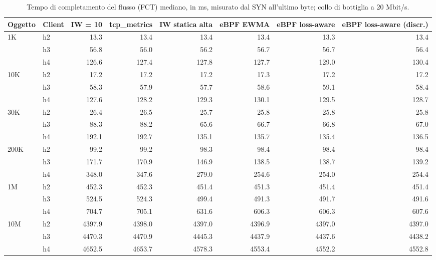 \begin{table}[htbp]
  \centering
  \caption{Tempo di completamento del flusso (FCT) mediano, in ms, misurato dal SYN all'ultimo byte; collo di bottiglia a 20 Mbit/s.}
  \label{tab:fct-med-20}
  \begin{tabular}{llrrrrrr}
    \toprule
    Oggetto & Client & IW = 10 & tcp\_metrics & IW statica alta & eBPF EWMA & eBPF loss-aware & eBPF loss-aware (discr.) \\
    \midrule
    1K & h2 & 13.3 & 13.4 & 13.4 & 13.4 & 13.3 & 13.4 \\
     & h3 & 56.8 & 56.0 & 56.2 & 56.7 & 56.7 & 56.4 \\
     & h4 & 126.6 & 127.4 & 127.8 & 127.7 & 129.0 & 130.4 \\
    \addlinespace
    10K & h2 & 17.2 & 17.2 & 17.2 & 17.3 & 17.2 & 17.2 \\
     & h3 & 58.3 & 57.9 & 57.7 & 58.6 & 59.1 & 58.4 \\
     & h4 & 127.6 & 128.2 & 129.3 & 130.1 & 129.5 & 128.7 \\
    \addlinespace
    30K & h2 & 26.4 & 26.5 & 25.7 & 25.8 & 25.8 & 25.8 \\
     & h3 & 88.3 & 88.2 & 65.6 & 66.7 & 66.8 & 67.0 \\
     & h4 & 192.1 & 192.7 & 135.1 & 135.7 & 135.4 & 136.5 \\
    \addlinespace
    200K & h2 & 99.2 & 99.2 & 98.3 & 98.4 & 98.4 & 98.4 \\
     & h3 & 171.7 & 170.9 & 146.9 & 138.5 & 138.7 & 139.2 \\
     & h4 & 348.0 & 347.6 & 279.0 & 254.6 & 254.0 & 254.4 \\
    \addlinespace
    1M & h2 & 452.3 & 452.3 & 451.4 & 451.3 & 451.4 & 451.4 \\
     & h3 & 524.5 & 524.3 & 499.4 & 491.3 & 491.7 & 491.6 \\
     & h4 & 704.7 & 705.1 & 631.6 & 606.3 & 606.3 & 607.6 \\
    \addlinespace
    10M & h2 & 4397.9 & 4398.0 & 4397.0 & 4396.9 & 4397.0 & 4397.0 \\
     & h3 & 4470.3 & 4470.9 & 4445.3 & 4437.9 & 4437.6 & 4438.2 \\
     & h4 & 4652.5 & 4653.7 & 4578.3 & 4553.4 & 4552.2 & 4552.8 \\
    \bottomrule
  \end{tabular}
\end{table}
